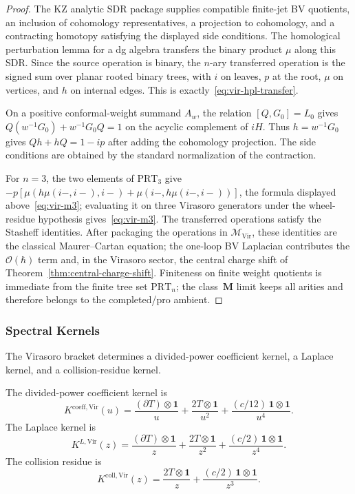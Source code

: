 \begin{proof}
The KZ analytic SDR package supplies compatible finite-jet BV quotients,
an inclusion of cohomology representatives, a projection to cohomology,
and a contracting homotopy satisfying the displayed side conditions. The
homological perturbation lemma for a dg algebra transfers the binary
product $\mu$ along this SDR. Since the source operation is binary, the
$n$-ary transferred operation is the signed sum over planar rooted
binary trees, with $i$ on leaves, $p$ at the root, $\mu$ on vertices, and
$h$ on internal edges. This is exactly~\eqref{eq:vir-hpl-transfer}.

On a positive conformal-weight summand $A_w$, the relation
$[Q,G_0]=L_0$ gives
$Q(w^{-1}G_0)+w^{-1}G_0Q=1$ on the acyclic complement of
$iH$. Thus $h=w^{-1}G_0$ gives $Qh+hQ=1-ip$ after adding the
cohomology projection. The side conditions are obtained by the standard
normalization of the contraction.

For $n=3$, the two elements of $\mathrm{PRT}_3$ give
$-p[\mu(h\mu(i-,i-),i-)+\mu(i-,h\mu(i-,i-))]$, the formula displayed
above~\eqref{eq:vir-m3}; evaluating it on three Virasoro generators
under the wheel-residue hypothesis gives~\eqref{eq:vir-m3}. The
transferred operations satisfy the Stasheff identities. After packaging
the operations in $\mathcal M_{\mathrm{Vir}}$, these identities are the
classical Maurer--Cartan equation; the one-loop BV Laplacian contributes
the $\mathcal O(\hbar)$ term and, in the Virasoro sector, the central
charge shift of Theorem~\ref{thm:central-charge-shift}. Finiteness on
finite weight quotients is immediate from the finite tree set
$\mathrm{PRT}_n$; the class~$\mathbf M$ limit keeps all arities and
therefore belongs to the completed/pro ambient.
\end{proof}

\subsubsection{Spectral Kernels}

The Virasoro bracket determines a divided-power coefficient kernel, a
Laplace kernel, and a collision-residue kernel.

\begin{definition}
\label{def:vir-r-matrix}
The divided-power coefficient kernel is
\begin{equation}
K^{\mathrm{coeff},\text{Vir}}(u)
=
\frac{(\partial T)\otimes \mathbf{1}}{u}
+ \frac{2T\otimes \mathbf{1}}{u^2}
+ \frac{(c/12)\,\mathbf{1}\otimes\mathbf{1}}{u^4}.
\end{equation}
The Laplace kernel is
\begin{equation}
K^{L,\text{Vir}}(z)
=
\frac{(\partial T)\otimes \mathbf{1}}{z}
+ \frac{2T\otimes \mathbf{1}}{z^2}
+ \frac{(c/2)\,\mathbf{1}\otimes\mathbf{1}}{z^4}.
\end{equation}
The collision residue is
\begin{equation}
K^{\mathrm{coll},\text{Vir}}(z)
=
\frac{2T\otimes\mathbf{1}}{z}
+ \frac{(c/2)\,\mathbf{1}\otimes\mathbf{1}}{z^3}.
\end{equation}
\end{definition}

